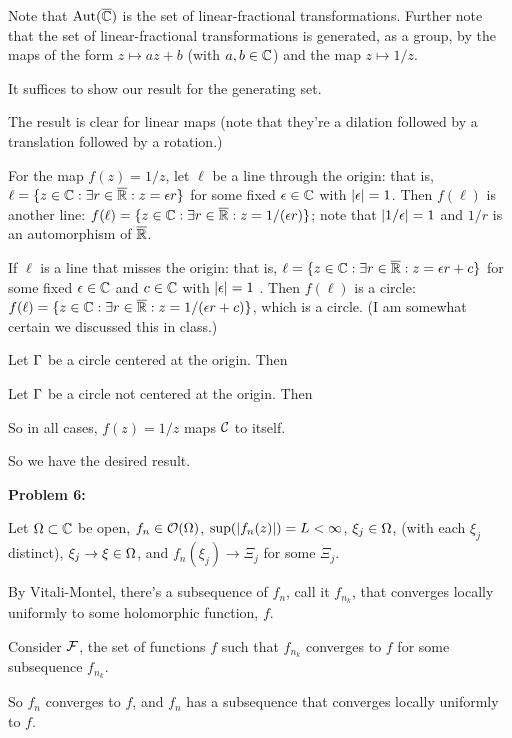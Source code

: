 \documentclass[a4paper,12pt]{article}
\begin{document}
Note that $\text{Aut}(\overline{\mathbb{C}})$ is the set of linear-fractional transformations. Further note that the set of linear-fractional transformations is generated, as a group, by the maps of the form $z \mapsto az+b$ (with $a,b \in \mathbb{C}$) and the map $z \mapsto 1/z$.

It suffices to show our result for the generating set.

The result is clear for linear maps (note that they're a dilation followed by a translation followed by a rotation.) 

For the map $f(z) = 1/z$, let $\ell$ be a line through the origin: that is, $\ell = \{z \in \mathbb{C}: \exists r \in \overline{\mathbb{R}}: z=\epsilon r\}$ for some fixed $\epsilon \in \mathbb{C}$ with $\left\lvert \epsilon \right\rvert = 1$. Then $f(\ell)$ is another line: $f(\ell) = \{z \in \mathbb{C}: \exists r \in \overline{\mathbb{R}}: z=1/(\epsilon r)\}$; note that $\left\lvert 1/\epsilon \right\rvert = 1$ and $1/r$ is an automorphism of $\overline{\mathbb{R}}$. 

If $\ell$ is a line that misses the origin: that is, $\ell = \{z \in \mathbb{C}: \exists r \in \overline{\mathbb{R}}: z=\epsilon r+ c\}$ for some fixed $\epsilon \in \mathbb{C}$ and $c \in \mathbb{C}$ with $\left\lvert \epsilon \right\rvert = 1$ . Then $f(\ell)$ is a circle: $f(\ell) = \{z \in \mathbb{C}: \exists r \in \overline{\mathbb{R}}: z = 1/(\epsilon r + c)\}$, which is a circle. (I am somewhat certain we discussed this in class.)  

Let $\Gamma$ be a circle centered at the origin. Then %

Let $\Gamma$ be a circle not centered at the origin. Then %

So in all cases, $f(z) = 1/z$ maps $\mathcal{C}$ to itself.

So we have the desired result. 

\shunt

{\bf Problem 6:}

Let $\Omega \subset \mathbb{C}$ be open, $f_n \in \mathcal{O}(\Omega)$, $\sup(\left\lvert f_n(z) \right\rvert) = L < \infty$, $\xi_j \in \Omega$, (with each $\xi_j$ distinct), $\xi_j \to \xi \in \Omega$, and $f_n(\xi_j) \to \Xi_j$ for some $\Xi_j$.

By Vitali-Montel, there's a subsequence of $f_n$, call it $f_{n_k}$, that converges locally uniformly to some holomorphic function, $f$.

Consider $\mathcal{F}$, the set of functions $f$ such that $f_{n_k}$ converges to $f$ for some subsequence $f_{n_k}$. %

So $f_n$ converges to $f$, and $f_n$ has a subsequence that converges locally uniformly to $f$. %
\end{document}
